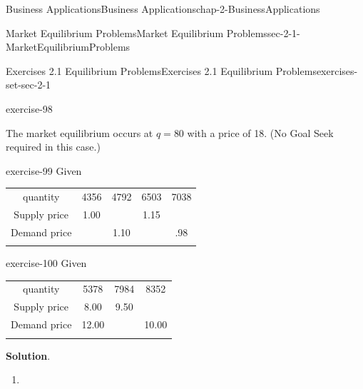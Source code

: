\documentclass[oneside,10pt,]{book}
\numberwithin{equation}{section}
\newcommand{\hrulethin}  {\noalign{\hrule height 0.04em}}
\newcommand{\hrulemedium}{\noalign{\hrule height 0.07em}}
\newcommand{\hrulethick} {\noalign{\hrule height 0.11em}}
\begin{document}
\begin{chapterptx}{Business Applications}{}{Business Applications}{}{}{chap-2-BusinessApplications}
\begin{sectionptx}{Market Equilibrium Problems}{}{Market Equilibrium Problems}{}{}{sec-2-1-MarketEquilibriumProblems}
\begin{exercises-subsection-numberless}{Exercises 2.1 Equilibrium Problems}{}{Exercises 2.1 Equilibrium Problems}{}{}{exercises-set-sec-2-1}
\begin{exercisegroup}
\begin{divisionexerciseeg}{7}{}{}{exercise-98}
\begin{enumerate}[label=(\alph*)]
\begin{sidebyside}{1}{0.2}{0.2}{0}
\end{sidebyside}%
 The market equilibrium occurs at \(q = 80\) with a price of \textdollar{}18. (No Goal Seek required in this case.)%
\end{enumerate}
\end{divisionexerciseeg}%
\begin{divisionexerciseeg}{8}{}{}{exercise-99}%
\hypertarget{p-613}{}%
Given%
\begin{sidebyside}{1}{0}{0}{0}%
\begin{sbspanel}{1}%
{\centering%
\begin{tabular}{ccccc}\hrulethick
quantity&4356&4792&6503&7038\tabularnewline\hrulethin
Supply price&\textdollar{}1.00&&\textdollar{}1.15&\tabularnewline\hrulemedium
Demand price&&\textdollar{}1.10&&\textdollar{}.98\tabularnewline\hrulemedium
\end{tabular}
\par}
\end{sbspanel}%
\end{sidebyside}%
\end{divisionexerciseeg}%
\begin{divisionexerciseeg}{9}{}{}{exercise-100}%
\hypertarget{p-614}{}%
Given%
\begin{sidebyside}{1}{0}{0}{0}%
\begin{sbspanel}{1}%
{\centering%
\begin{tabular}{cccc}\hrulethick
quantity&5378&7984&8352\tabularnewline\hrulethin
Supply price&\textdollar{}8.00&\textdollar{}9.50&\tabularnewline\hrulemedium
Demand price&\textdollar{}12.00&&\textdollar{}10.00\tabularnewline\hrulemedium
\end{tabular}
\par}
\end{sbspanel}%
\end{sidebyside}%
\par\smallskip%
\noindent\textbf{Solution}.\hypertarget{solution-48}{}\quad%
\leavevmode%
\begin{enumerate}[label=(\alph*)]
\item\hypertarget{li-174}{}\leavevmode%
\begin{sidebyside}{1}{0}{0}{0}%
\begin{sbspanel}{1}%

\end{sbspanel}
\end{sidebyside}
\end{enumerate}
\end{divisionexerciseeg}
\end{exercisegroup}
\end{exercises-subsection-numberless}
\end{sectionptx}
\end{chapterptx}
\end{document}
